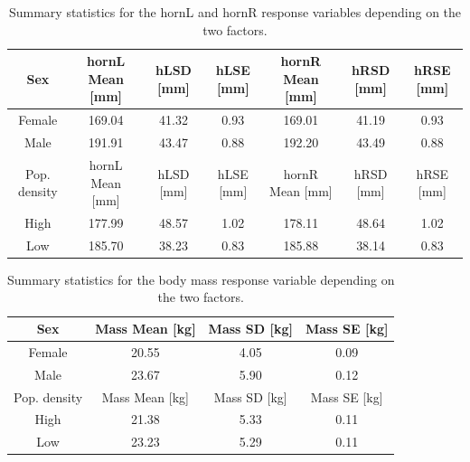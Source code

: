 \documentclass{article}
\begin{document}
\begin{table}[H]
\centering
\caption{Summary statistics for the hornL and hornR response variables depending on the two factors.}
\begin{tabular}{c c c c c c c} 
 \hline
Sex & hornL Mean [mm] & hLSD [mm] & hLSE [mm] & hornR Mean [mm] & hRSD [mm] & hRSE [mm]    \\  
 \hline
 Female &169.04&41.32&0.93&169.01&41.19&0.93 \\
 Male &191.91&43.47&0.88&192.20&43.49& 0.88 \\
 \hline
 \hline
 Pop. density & hornL Mean [mm] & hLSD [mm] & hLSE [mm] & hornR Mean [mm] & hRSD [mm] & hRSE [mm]  \\  
 \hline
 High &177.99&48.57&1.02&178.11&48.64&1.02  \\
 Low &185.70&38.23&0.83&185.88&38.14&0.83  \\
 \hline
\end{tabular}
\label{tab:aov1}
\end{table}
\begin{table}[H]
\centering
\caption{Summary statistics for the body mass response variable depending on the two factors.}
\begin{tabular}{c c c c} 
 \hline
Sex & Mass Mean [kg] & Mass SD [kg] & Mass SE [kg]   \\  
 \hline
 Female &20.55&4.05&0.09 \\
 Male &23.67&5.90&0.12  \\
 \hline
 \hline
 Pop. density & Mass Mean [kg] & Mass SD [kg] & Mass SE [kg] \\  
 \hline
 High &21.38&5.33&0.11 \\
 Low &23.23&5.29&0.11  \\
 \hline
\end{tabular}
\label{tab:aov3}
\end{table}
\end{document}
